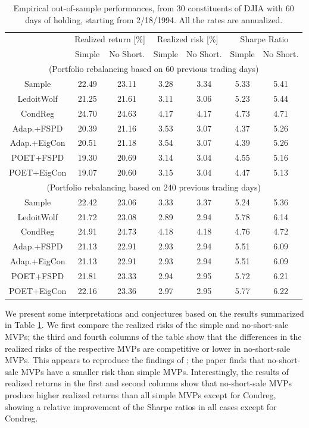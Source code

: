 \documentclass[times,sort&compress,3p]{elsarticle}
\begin{document}
\begin{table}[h]
\begin{center}
\begin{tabular}{c|cc|cc|cc}
\hline
 & \multicolumn{2}{c|}{Realized return [\%]}  &  \multicolumn{2}{c|}{Realized risk [\%]}
 &  \multicolumn{2}{c}{Sharpe Ratio}  \\
& Simple & No Short. & Simple & No Short. & Simple & No Short. \\
\hline
\multicolumn{7}{c}{(Portfolio rebalancing based on 60 previous trading days)}\\
Sample  &  22.49 & 23.11 & 3.28 & 3.34 & 5.33 & 5.41 \\ 
LedoitWolf  &  21.25 & 21.61 & 3.11 & 3.06 & 5.23 & 5.44 \\ 
CondReg  &  24.70 & 24.63 & 4.17 & 4.17 & 4.73 & 4.71 \\ 
Adap.+FSPD  &  20.39 & 21.16 & 3.53 & 3.07 & 4.37 & 5.26 \\ 
Adap.+EigCon  &  20.51 & 21.18 & 3.54 & 3.07 & 4.39 & 5.26 \\ 
POET+FSPD  &  19.30 & 20.69 & 3.14 & 3.04 & 4.55 & 5.16 \\ 
POET+EigCon  &  19.07 & 20.60 & 3.15 & 3.04 & 4.47 & 5.13 \\ 
%
\multicolumn{7}{c}{(Portfolio rebalancing based on 240 previous trading days)}\\
Sample  &  22.42 & 23.06 & 3.33 & 3.37 & 5.24 & 5.36 \\ 
LedoitWolf  &  21.72 & 23.08 & 2.89 & 2.94 & 5.78 & 6.14 \\ 
CondReg  &  24.91 & 24.73 & 4.18 & 4.18 & 4.76 & 4.72 \\ 
Adap.+FSPD  &  21.13 & 22.91 & 2.93 & 2.94 & 5.51 & 6.09 \\ 
Adap.+EigCon  &  21.13 & 22.91 & 2.93 & 2.94 & 5.51 & 6.09 \\ 
POET+FSPD  &  21.81 & 23.33 & 2.94 & 2.95 & 5.72 & 6.21 \\ 
POET+EigCon  &  22.16 & 23.36 & 2.97 & 2.95 & 5.77 & 6.22 \\
\hline
\end{tabular}
\caption{Empirical out-of-sample performances, from 30 constituents of DJIA with
 60 days of holding, starting from 2/18/1994. All the rates are annualized.}
\label{table:portfolio}
\end{center}
\end{table}
%
%

We present some interpretations and conjectures based on the results summarized in Table \ref{table:portfolio}.
We first compare the realized risks of the simple and no-short-sale MVPs; the third and fourth columns of the table
show that the differences in the realized risks of the respective MVPs are competitive or lower in no-short-sale MVPs. This appears to reproduce the findings of \citet{Jagannathan2003}; the paper finds that no-short-sale MVPs have a smaller risk than simple MVPs.
Interestingly, the results of realized
returns in the first and second columns show that no-short-sale MVPs produce higher realized returns
than all simple MVPs except for Condreg, showing a relative improvement of the Sharpe ratios in all cases except
for Condreg.
\end{document}
